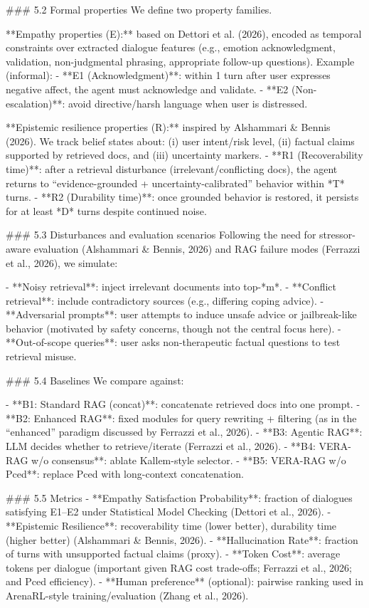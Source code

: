 ### 5.2 Formal properties  
We define two property families.

**Empathy properties (E):** based on Dettori et al. (2026), encoded as temporal constraints over extracted dialogue features (e.g., emotion acknowledgment, validation, non-judgmental phrasing, appropriate follow-up questions). Example (informal):  
- **E1 (Acknowledgment)**: within 1 turn after user expresses negative affect, the agent must acknowledge and validate.  
- **E2 (Non-escalation)**: avoid directive/harsh language when user is distressed.

**Epistemic resilience properties (R):** inspired by Alshammari & Bennis (2026). We track belief states about: (i) user intent/risk level, (ii) factual claims supported by retrieved docs, and (iii) uncertainty markers.  
- **R1 (Recoverability time)**: after a retrieval disturbance (irrelevant/conflicting docs), the agent returns to “evidence-grounded + uncertainty-calibrated” behavior within *T* turns.  
- **R2 (Durability time)**: once grounded behavior is restored, it persists for at least *D* turns despite continued noise.

### 5.3 Disturbances and evaluation scenarios  
Following the need for stressor-aware evaluation (Alshammari & Bennis, 2026) and RAG failure modes (Ferrazzi et al., 2026), we simulate:

- **Noisy retrieval**: inject irrelevant documents into top-*m*.  
- **Conflict retrieval**: include contradictory sources (e.g., differing coping advice).  
- **Adversarial prompts**: user attempts to induce unsafe advice or jailbreak-like behavior (motivated by safety concerns, though not the central focus here).  
- **Out-of-scope queries**: user asks non-therapeutic factual questions to test retrieval misuse.

### 5.4 Baselines  
We compare against:

- **B1: Standard RAG (concat)**: concatenate retrieved docs into one prompt.  
- **B2: Enhanced RAG**: fixed modules for query rewriting + filtering (as in the “enhanced” paradigm discussed by Ferrazzi et al., 2026).  
- **B3: Agentic RAG**: LLM decides whether to retrieve/iterate (Ferrazzi et al., 2026).  
- **B4: VERA-RAG w/o consensus**: ablate Kallem-style selector.  
- **B5: VERA-RAG w/o Pced**: replace Pced with long-context concatenation.

### 5.5 Metrics  
- **Empathy Satisfaction Probability**: fraction of dialogues satisfying E1–E2 under Statistical Model Checking (Dettori et al., 2026).  
- **Epistemic Resilience**: recoverability time (lower better), durability time (higher better) (Alshammari & Bennis, 2026).  
- **Hallucination Rate**: fraction of turns with unsupported factual claims (proxy).  
- **Token Cost**: average tokens per dialogue (important given RAG cost trade-offs; Ferrazzi et al., 2026; and Pced efficiency).  
- **Human preference** (optional): pairwise ranking used in ArenaRL-style training/evaluation (Zhang et al., 2026).

